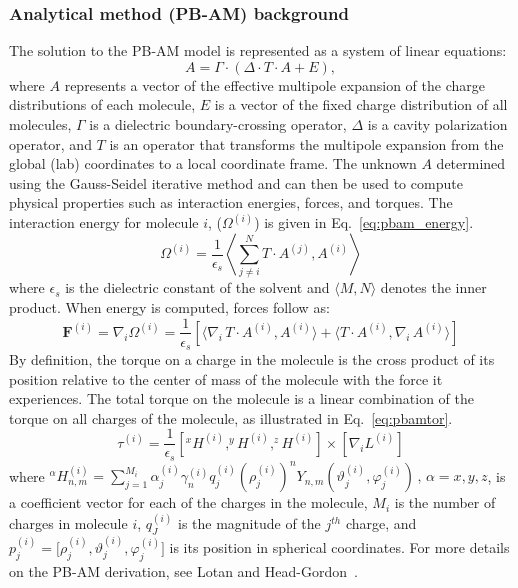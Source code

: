 \documentclass[12pt,titlepage]{article}
\begin{document}
\subsubsection{Analytical method (PB-AM) background}
The solution to the PB-AM model is represented as a system of linear equations:
\begin{equation} \label{eq:pbam_solve}
	{A} = \Gamma \cdot (\Delta \cdot T \cdot {A} + {E}),
\end{equation}
where \({A}\) represents a vector of the effective multipole expansion of the charge distributions of each molecule, \({E}\) is a vector of the fixed charge distribution of all molecules, \(\Gamma\) is a dielectric boundary-crossing operator, \(\Delta\) is a cavity polarization operator, and \(T\) is an operator that transforms the multipole expansion from the global (lab) coordinates to a local coordinate frame. 
The unknown \({A}\) determined using the Gauss-Seidel iterative method and can then be used to compute physical properties such as interaction energies, forces, and torques. 
The interaction energy for molecule \(i\), ($\Omega^{(i)}$) is given in Eq.~\ref{eq:pbam_energy}.
%
\begin{equation}\label{eq:pbam_energy}
\Omega^{(i)}=\frac{1}{\epsilon_s} \left \langle \sum_{j \ne i}^N  T \cdot A^{(j) } ,  A^{(i) } \right \rangle 
\end{equation}
%
where $\epsilon_s$ is the dielectric constant of the solvent and $\langle  M, N \rangle$ denotes the inner product.
When energy is computed, forces follow as:
%
\begin{equation}\label{eq:pbam_force}
	\textbf{F}^{(i)} = \nabla_i \Omega^{(i)}=\frac{1}{\epsilon_s} [ \langle \nabla_i \,T \cdot A^{(i) } ,  A^{(i) } \rangle +  \langle T \cdot A^{(i) } ,   \nabla_i \, A^{(i) } \rangle ]
\end{equation}
%
By definition, the torque on a charge in the molecule is the cross product of its position relative to the center of mass of the molecule with the force it experiences.
The total torque on the molecule is a linear combination of the torque on all charges of the molecule, as illustrated in Eq.~\ref{eq:pbamtor}.
%
\begin{equation}\label{eq:pbamtor}
	\tau^{(i)} =  \frac{1}{\epsilon_s}\left [  ^xH^{(i)}, ^yH^{(i)}, ^zH^{(i)} \right] \times   \left [  \nabla_i L^{(i)} \right ]
\end{equation} 
%
where $^\alpha H_{n,m}^{(i)}  = \sum_{j=1}^{M_i} \alpha_{j}^{(i)} \gamma_n^{(i)} q_j^{(i)} (\rho_j^{(i)})^n Y_{n,m} (\vartheta_j^{(i)}, \varphi_j^{(i)}) \, , \, \alpha = x , y, z$, is a coefficient vector for each of the charges in the molecule, $M_i$ is the number of charges in molecule $i$, $q_J^{(i)}$ is the magnitude of the $j^{th}$ charge, and $p_j^{(i)}=\Big[\rho_j^{(i)},\vartheta_j^{(i)},\varphi_j^{(i)}\Big]$ is its position in spherical coordinates.
For more details on the PB-AM derivation, see Lotan and Head-Gordon~\cite{Lotan2006}.
\end{document}
